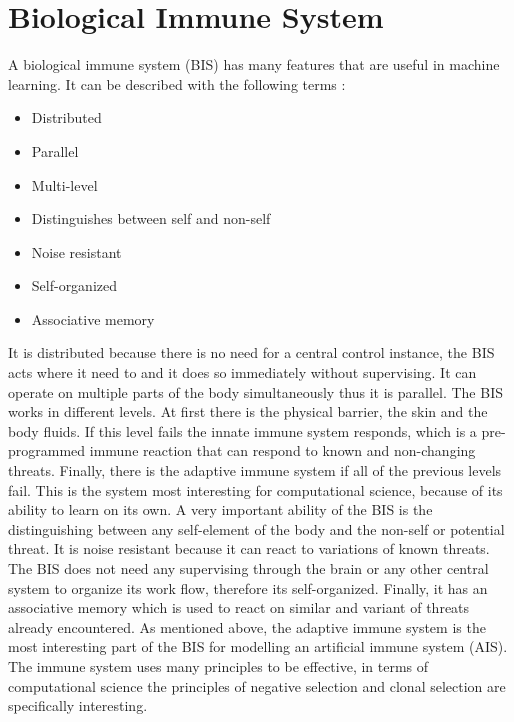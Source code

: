 %
%
% 
% 
% 


\chapter{Biological Immune System}
\label{chap:bis}

\nocite{DEC02}
\nocite{NAN08}
\nocite{PAM17}
\nocite{RIFF09}

A biological immune system (BIS) has many features that are useful in machine learning. It can be described with the following terms \cite{tan2016artificial}:
\begin{itemize}
	\item 	Distributed
	\item 	Parallel
	\item 	Multi-level
	\item 	Distinguishes between self and non-self
	\item 	Noise resistant
	\item 	Self-organized
	\item 	Associative memory
	
\end{itemize}
It is distributed because there is no need for a central control instance, the BIS acts where it need to and it does so immediately without supervising. It can operate on multiple parts of the body simultaneously thus it is parallel. The BIS works in different levels. At first there is the physical barrier, the skin and the body fluids. If this level fails the innate immune system responds, which is a pre-programmed immune reaction that can respond to known and non-changing threats. Finally, there is the adaptive immune system if all of the previous levels fail. This is the system most interesting for computational science, because of its ability to learn on its own. A very important ability of the BIS is the distinguishing between any self-element of the body and the non-self or potential threat. It is noise resistant because it can react to variations of known threats. The BIS does not need any supervising through the brain or any other central system to organize its work flow, therefore its self-organized. Finally, it has an associative memory which is used to react on similar and variant of threats already encountered.
As mentioned above, the adaptive immune system is the most interesting part of the BIS for modelling an artificial immune system (AIS). The immune system uses many principles to be effective, in terms of computational science the principles of negative selection and clonal selection are specifically interesting.

